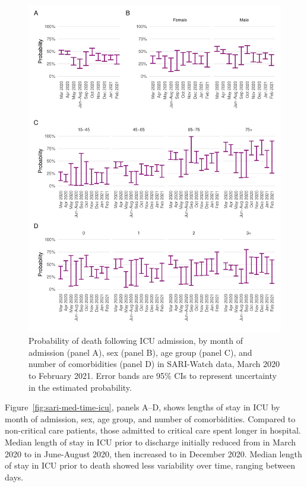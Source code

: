 \begin{figure}[htbp!]
    \centering
    \includegraphics[width=\textwidth]{sari_icu_prob.pdf}
    \caption[Probability of death following ICU admission in SARI-Watch data, March 2020 to February 2021]{Probability of death following ICU admission, by month of admission (panel A), sex (panel B), age group (panel C), and number of comorbidities (panel D) in SARI-Watch data, March 2020 to February 2021. Error bands are 95\% CIs to represent uncertainty in the estimated probability.}\label{fig:sari-icu-prob}
\end{figure}

Figure~\ref{fig:sari-med-time-icu}, panels A--D, shows lengths of stay in ICU by month of admission, sex, age group, and number of comorbidities. Compared to non-critical care patients, those admitted to critical care spent longer in hospital. Median length of stay in ICU prior to discharge initially reduced from  in March 2020 to  in June-August 2020, then increased to  in December 2020. Median length of stay in ICU prior to death showed less variability over time, ranging between  days.

